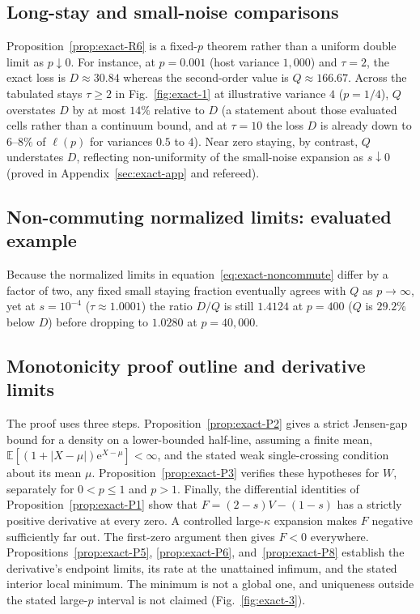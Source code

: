 \subsection{Long-stay and small-noise comparisons}\label{esm:exact-long-stays}

Proposition~\ref{prop:exact-R6} is a fixed-$p$ theorem rather than a uniform double limit as $p \downarrow 0$. For instance, at $p = 0.001$ (host variance $1{,}000$) and $\tau = 2$, the exact loss is $D \approx 30.84$ whereas the second-order value is $Q \approx 166.67$. Across the tabulated stays $\tau \ge 2$ in Fig.~\ref{fig:exact-1} at illustrative variance $4$ ($p = 1/4$), $Q$ overstates $D$ by at most $14\%$ relative to $D$ (a statement about those evaluated cells rather than a continuum bound, and at $\tau = 10$ the loss $D$ is already down to $6$--$8\%$ of $\ell(p)$ for variances $0.5$ to $4$). Near zero staying, by contrast, $Q$ understates $D$, reflecting non-uniformity of the small-noise expansion as $s \downarrow 0$ (proved in Appendix~\ref{sec:exact-app} and refereed).

\subsection{Non-commuting normalized limits: evaluated example}\label{esm:exact-limits-example}

Because the normalized limits in equation~\eqref{eq:exact-noncommute} differ by a factor of two, any fixed small staying fraction eventually agrees with $Q$ as $p \to \infty$, yet at $s = 10^{-4}$ ($\tau \approx 1.0001$) the ratio $D/Q$ is still $1.4124$ at $p = 400$ ($Q$ is $29.2\%$ below $D$) before dropping to $1.0280$ at $p = 40{,}000$.

\subsection{Monotonicity proof outline and derivative limits}\label{esm:exact-proof-outline}

The proof uses three steps. Proposition~\ref{prop:exact-P2} gives a strict Jensen-gap bound for a density on a lower-bounded half-line, assuming a finite mean, $\mathbb E[(1+|X-\mu|)\mathrm{e}^{X-\mu}]<\infty$, and the stated weak single-crossing condition about its mean $\mu$. Proposition~\ref{prop:exact-P3} verifies these hypotheses for $W$, separately for $0<p\leq1$ and $p>1$. Finally, the differential identities of Proposition~\ref{prop:exact-P1} show that $F=(2-s)V-(1-s)$ has a strictly positive derivative at every zero. A controlled large-$\kappa$ expansion makes $F$ negative sufficiently far out. The first-zero argument then gives $F<0$ everywhere. Propositions~\ref{prop:exact-P5}, \ref{prop:exact-P6}, and~\ref{prop:exact-P8} establish the derivative's endpoint limits, its rate at the unattained infimum, and the stated interior local minimum. The minimum is not a global one, and uniqueness outside the stated large-$p$ interval is not claimed (Fig.~\ref{fig:exact-3}).

